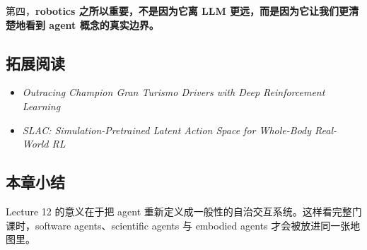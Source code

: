 \documentclass[a4paper]{article}
\begin{document}
第四，\textbf{robotics 之所以重要，不是因为它离 LLM 更远，而是因为它让我们更清楚地看到 agent 概念的真实边界。}

\subsection{拓展阅读}
\begin{itemize}[leftmargin=1.5em]
\item \emph{Outracing Champion Gran Turismo Drivers with Deep Reinforcement Learning}
\item \emph{SLAC: Simulation-Pretrained Latent Action Space for Whole-Body Real-World RL}
\end{itemize}

\subsection{本章小结}
Lecture 12 的意义在于把 agent 重新定义成一般性的自治交互系统。这样看完整门课时，software agents、scientific agents 与 embodied agents 才会被放进同一张地图里。
\end{document}
